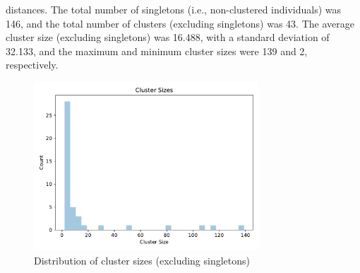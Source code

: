 \documentclass{article}
\begin{document}
distances. The total number of singletons (i.e., non-clustered individuals) was 146, and the total number of clusters (excluding singletons) was 43. The average cluster size (excluding singletons) was 16.488, with a standard deviation of 32.133, and the maximum and minimum cluster sizes were 139 and 2, respectively.

\begin{figure}[h]
\centering
\includegraphics[width=0.75\textwidth,keepaspectratio]{./figs/cluster_sizes.pdf}
\caption{Distribution of cluster sizes (excluding singletons)}
\end{figure}
\end{document}
